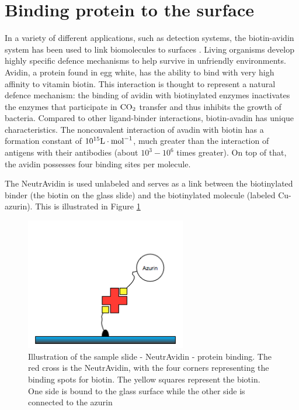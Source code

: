 \documentclass[twoside,single]{lion-msc}
\begin{document}
\section{Binding protein to the surface}\label{neutra}
In a variety of different applications, such as detection systems, the biotin-avidin system has been used to link biomolecules to surfaces \cite{Diamandis1991}. Living organisms develop highly specific defence mechanisms to help survive in unfriendly environments. Avidin, a protein found in egg white, has the ability to bind with very high affinity to vitamin biotin. This interaction is thought to represent a natural defence mechanism: the binding of avidin with biotinylated enzymes inactivates the enzymes that participate in $\textup{CO}_{2}$ transfer and thus inhibits the growth of bacteria. Compared to other  ligand-binder interactions, biotin-avadin has unique characteristics. The nonconvalent interaction of avadin with biotin has a formation constant of $10^{15}\textup{L}\cdot \textup{mol}^{-1}$, much greater than the interaction of antigens with their antibodies (about $10^{3}-10^{6}$ times greater). On top of that, the avidin possesses four binding sites per molecule. 

The NeutrAvidin is used unlabeled and serves as a link between the biotinylated binder (the biotin on the glass slide) and the biotinylated molecule (labeled Cu-azurin). This is illustrated in Figure \ref{avadinbinding} 

\begin{figure}[ht!]
\centering
\includegraphics[width=70mm]{avadin}
\caption{Illustration of the sample slide - NeutrAvidin - protein binding. The red cross is the NeutrAvidin, with the four corners representing the binding spots for biotin. The yellow squares represent the biotin. One side is bound to the glass surface while the other side is connected to the azurin}
\label{avadinbinding}
\end{figure}
\end{document}
